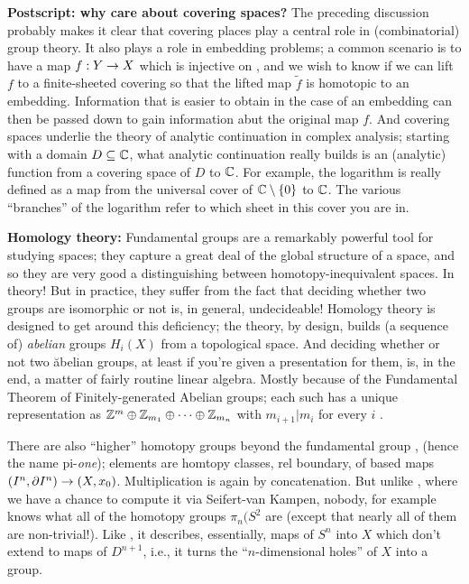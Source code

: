 {\bf Postscript: why care about covering spaces?} The preceding discussion
probably makes it clear that covering places play a central role in
(combinatorial) group theory. It also plays a role in embedding 
problems; a common scenario is to have a map $f:Y\rightarrow X$ which is 
injective on \mpu , and we wish to know if we can lift $f$ to a 
finite-sheeted covering so that the lifted map $\widetilde{f}$ is 
homotopic to an embedding. Information that is easier to obtain 
in the case of an embedding can then be passed down to gain information
abut the original map $f$. And covering spaces underlie the 
theory of analytic continuation in complex analysis; starting
with a domain $D\subseteq {\Bbb C}$, what analytic continuation really
builds is an (analytic) function from a covering space of $D$ to ${\Bbb C}$.
For example, the logarithm is really defined as a map from 
the universal cover of ${\Bbb C}\setminus\{0\}$ to ${\Bbb C}$. 
The various ``branches'' of the logarithm refer to which sheet
in this cover you are in.

\bsk

{\bf Homology theory:} Fundamental groups are a remarkably powerful
tool for studying spaces; they capture a great deal of the global
structure of a space, and so they are very good a distinguishing
between homotopy-inequivalent spaces. In theory! But in practice,
they suffer from the fact that deciding whether two groups are 
isomorphic or not is, in general, undecideable! Homology theory
is designed to get around this deficiency; the theory, by design,
builds (a sequence of) {\it abelian} groups $H_i(X)$ from a topological
space. And deciding whether or not two \u{abelian} groups, at least
if you're given a presentation for them, is, in the end, a matter of
fairly routine linear algebra. Mostly because of the Fundamental Theorem
of Finitely-generated Abelian groups; each such has a unique representation
as ${\Bbb Z}^m\oplus{\Bbb Z}_{m_1}\oplus\cdots\oplus{\Bbb Z}_{m_n}$
with $m_{i+1}|m_i$ for every $i$ .

\msk

There are also ``higher'' homotopy groups beyond the fundamental group \mpu ,
(hence the name pi-{\it one}); elements are homtopy classes, rel boundary, 
of based maps $(I^n,\partial I^n)\rightarrow(X,x_0)$. Multiplication is again by
concatenation. But unlike \mpu , where we have a chance to compute it
via Seifert-van Kampen, nobody, for example knows what all of the 
homotopy groups $\pi_n(S^2$ are (except that nearly all of them are
non-trivial!). Like \mpu, it describes, essentially, maps of $S^n$ into
$X$ which don't extend to maps of $D^{n+1}$, i.e., it turns the ``$n$-dimensional
holes'' of $X$ into a group.

